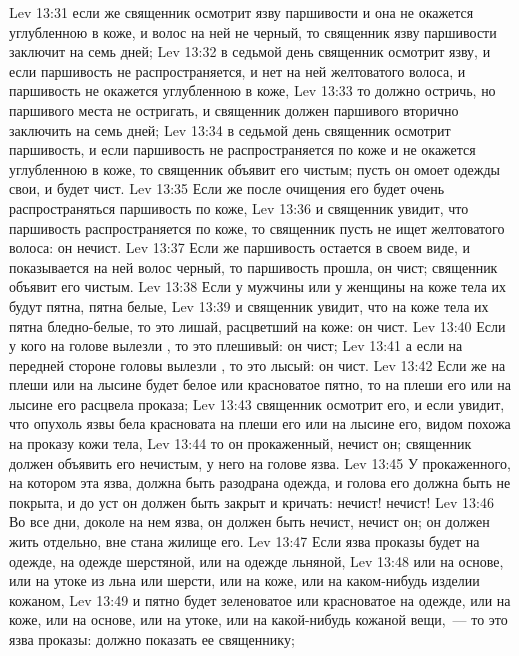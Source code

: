 \vs Lev 13:31 если же священник осмотрит язву паршивости и она не окажется углубленною в коже, и волос на ней не черный, то священник  язву паршивости заключит на семь дней;
\vs Lev 13:32 в седьмой день священник осмотрит язву, и если паршивость не распространяется, и нет на ней желтоватого волоса, и паршивость не окажется углубленною в коже,
\vs Lev 13:33 то  должно остричь, но паршивого места не остригать, и священник должен паршивого вторично заключить на семь дней;
\vs Lev 13:34 в седьмой день священник осмотрит паршивость, и если паршивость не распространяется по коже и не окажется углубленною в коже, то священник объявит его чистым; пусть он омоет одежды свои, и будет чист.
\vs Lev 13:35 Если же после очищения его будет очень распространяться паршивость по коже,
\vs Lev 13:36 и священник увидит, что паршивость распространяется по коже, то священник пусть не ищет желтоватого волоса: он нечист.
\vs Lev 13:37 Если же паршивость остается в своем виде, и показывается на ней волос черный, то паршивость прошла, он чист; священник объявит его чистым.
\vs Lev 13:38 Если у мужчины или у женщины на коже тела их будут пятна, пятна белые,
\vs Lev 13:39 и священник увидит, что на коже тела их пятна бледно-белые, то это лишай, расцветший на коже: он чист.
\rsbpar\vs Lev 13:40 Если у кого на голове вылезли , то это плешивый: он чист;
\vs Lev 13:41 а если на передней стороне головы вылезли , то это лысый: он чист.
\vs Lev 13:42 Если же на плеши или на лысине будет белое или красноватое пятно, то на плеши его или на лысине его расцвела проказа;
\vs Lev 13:43 священник осмотрит его, и если увидит, что опухоль язвы бела  красновата на плеши его или на лысине его, видом похожа на проказу кожи тела,
\vs Lev 13:44 то он прокаженный, нечист он; священник должен объявить его нечистым, у него на голове язва.
\vs Lev 13:45 У прокаженного, на котором эта язва, должна быть разодрана одежда, и голова его должна быть не покрыта, и до уст он должен быть закрыт и кричать: нечист! нечист!
\vs Lev 13:46 Во все дни, доколе на нем язва, он должен быть нечист, нечист он; он должен жить отдельно, вне стана жилище его.
\rsbpar\vs Lev 13:47 Если язва проказы будет на одежде, на одежде шерстяной, или на одежде льняной,
\vs Lev 13:48 или на основе, или на утоке из льна или шерсти, или на коже, или на каком-нибудь изделии кожаном,
\vs Lev 13:49 и пятно будет зеленоватое или красноватое на одежде, или на коже, или на основе, или на утоке, или на какой-нибудь кожаной вещи,~--- то это язва проказы: должно показать ее священнику;

